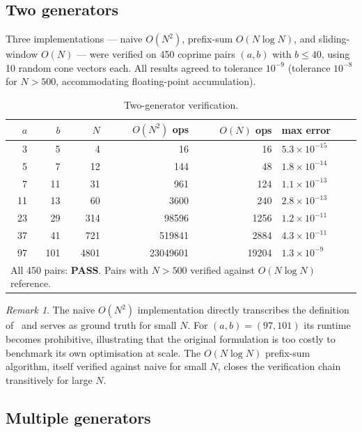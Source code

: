 \documentclass[11pt,a4paper]{amsart}
\theoremstyle{plain}
\theoremstyle{definition}
\theoremstyle{remark}
\newtheorem{remark}[theorem]{Remark}
\begin{document}
\subsection{Two generators}

Three implementations --- naive $O(N^2)$, prefix-sum $O(N\log N)$,
and sliding-window $O(N)$ --- were verified on 450 coprime pairs
$(a,b)$ with $b \leq 40$, using 10 random cone vectors each.
All results agreed to tolerance $10^{-9}$ (tolerance $10^{-8}$ for
$N > 500$, accommodating floating-point accumulation).

\begin{table}[H]
\centering
\begin{tabular}{rrrrrl}
\hline
$a$ & $b$ & $N$ & $O(N^2)$ ops & $O(N)$ ops & max error \\
\hline
  3 &   5 &     4 &          16 &        16 & $5.3\times10^{-15}$ \\
  5 &   7 &    12 &         144 &        48 & $1.8\times10^{-14}$ \\
  7 &  11 &    31 &         961 &       124 & $1.1\times10^{-13}$ \\
 11 &  13 &    60 &        3600 &       240 & $2.8\times10^{-13}$ \\
 23 &  29 &   314 &       98596 &      1256 & $1.2\times10^{-11}$ \\
 37 &  41 &   721 &      519841 &      2884 & $4.3\times10^{-11}$ \\
 97 & 101 &  4801 &   23049601 &     19204 & $1.3\times10^{-9}$  \\
\hline
\multicolumn{6}{l}{All 450 pairs: \textbf{PASS}.
  Pairs with $N>500$ verified against $O(N\log N)$ reference.}
\end{tabular}
\caption{Two-generator verification.}
\label{tab:two-gen}
\end{table}

\begin{remark}
The naive $O(N^2)$ implementation directly transcribes the definition
of~\cite{Huang2026} and serves as ground truth for small $N$.
For $(a,b) = (97,101)$ its runtime becomes prohibitive, illustrating
that the original formulation is too costly to benchmark its own
optimisation at scale. The $O(N\log N)$ prefix-sum algorithm, itself
verified against naive for small $N$, closes the verification chain
transitively for large $N$.
\end{remark}

\subsection{Multiple generators}
\end{document}
